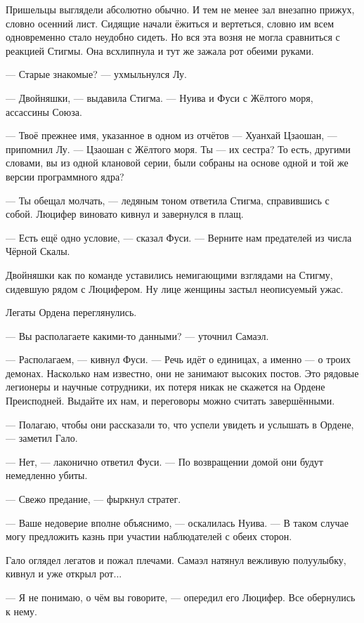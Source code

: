 Пришельцы выглядели абсолютно обычно.
И тем не менее зал внезапно прижух, словно осенний лист.
Сидящие начали ёжиться и вертеться, словно им всем одновременно стало неудобно сидеть.
Но вся эта возня не могла сравниться с реакцией Стигмы.
Она всхлипнула и тут же зажала рот обеими руками.

--- Старые знакомые? --- ухмыльнулся Лу.

--- Двойняшки, --- выдавила Стигма.
--- Нуива и Фуси с Жёлтого моря, ассассины Союза.

--- Твоё прежнее имя, указанное в одном из отчётов --- Хуанхай Цзаошан, --- припомнил Лу.
--- Цзаошан с Жёлтого моря.
Ты --- их сестра?
То есть, другими словами, вы из одной клановой серии, были собраны на основе одной и той же версии программного ядра?

--- Ты обещал молчать, --- ледяным тоном ответила Стигма, справившись с собой.
Люцифер виновато кивнул и завернулся в плащ.

\textspace

--- Есть ещё одно условие, --- сказал Фуси.
--- Верните нам предателей из числа Чёрной Скалы.

Двойняшки как по команде уставились немигающими взглядами на Стигму, сидевшую рядом с Люцифером.
Ну лице женщины застыл неописуемый ужас.

Легаты Ордена переглянулись.

--- Вы располагаете какими-то данными? --- уточнил Самаэл.

--- Располагаем, --- кивнул Фуси.
--- Речь идёт о единицах, а именно --- о троих демонах.
Насколько нам известно, они не занимают высоких постов.
Это рядовые легионеры и научные сотрудники, их потеря никак не скажется на Ордене Преисподней.
Выдайте их нам, и переговоры можно считать завершёнными.

--- Полагаю, чтобы они рассказали то, что успели увидеть и услышать в Ордене, --- заметил Гало.

--- Нет, --- лаконично ответил Фуси.
--- По возвращении домой они будут немедленно убиты.

--- Свежо предание, --- фыркнул стратег.

--- Ваше недоверие вполне объяснимо, --- оскалилась Нуива.
--- В таком случае могу предложить казнь при участии наблюдателей с обеих сторон.

Гало оглядел легатов и пожал плечами.
Самаэл натянул вежливую полуулыбку, кивнул и уже открыл рот...

--- Я не понимаю, о чём вы говорите, --- опередил его Люцифер.
Все обернулись к нему.

